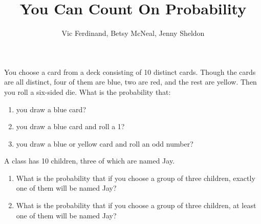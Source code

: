 \documentclass[nooutcomes]{ximera}
\title{You Can Count On Probability}
\author{Vic Ferdinand, Betsy McNeal, Jenny Sheldon}
\begin{document}
\begin{abstract}
\end{abstract}
\maketitle




\begin{problem}
You choose a card from a deck consisting of 10 distinct cards.  Though the cards are all distinct, four of them are blue, two are red, and the rest are yellow.  Then you roll a six-sided die.  What is the probability that:
\begin{enumerate}
\item you draw a blue card?
\item you draw a blue card and roll a 1?
\item you draw a blue or yellow card and roll an odd number?
\end{enumerate}
\vfill
\end{problem}

\begin{problem}
A class has 10 children, three of which are named Jay.  
\begin{enumerate}
\item What is the probability that if you choose a group of three children, exactly one of them will be named Jay?
\item What is the probability that if you choose a group of three children, at least one of them will be named Jay?
\end{enumerate}
\vfill
\end{problem}
\end{document}
